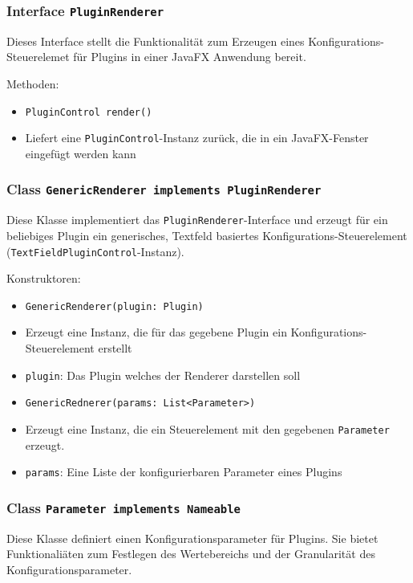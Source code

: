 \documentclass[parskip=full,11pt]{scrartcl}
\begin{document}
\subsubsection{Interface \texttt{PluginRenderer}}

Dieses Interface stellt die Funktionalität zum Erzeugen eines Konfigurations-Steuerelemet für Plugins in einer JavaFX Anwendung bereit.

Methoden:

\begin{itemize}\itemsep -10pt
	\item \texttt{PluginControl render()}
	\item[] Liefert eine \texttt{PluginControl}-Instanz zurück, die in ein JavaFX-Fenster eingefügt werden kann
\end{itemize}

\subsubsection{Class \texttt{GenericRenderer implements PluginRenderer}}

Diese Klasse implementiert das \texttt{PluginRenderer}-Interface und erzeugt für ein beliebiges Plugin ein generisches, Textfeld basiertes Konfigurations-Steuerelement (\texttt{TextFieldPluginControl}-Instanz).

Konstruktoren:

\begin{itemize}\itemsep -10pt
	\item \texttt{GenericRenderer(plugin: Plugin)}
	\item[] Erzeugt eine Instanz, die für das gegebene Plugin ein Konfigurations-Steuerelement erstellt
	\item[] \texttt{plugin}: Das Plugin welches der Renderer darstellen soll
	\item \texttt{GenericRednerer(params: List<Parameter>)}
	\item[] Erzeugt eine Instanz, die ein Steuerelement mit den gegebenen \texttt{Parameter} erzeugt.
	\item[] \texttt{params}: Eine Liste der konfigurierbaren Parameter eines Plugins
\end{itemize} 

\subsubsection{Class \texttt{Parameter implements Nameable}}

Diese Klasse definiert einen Konfigurationsparameter für Plugins. Sie bietet Funktionaliäten zum Festlegen des Wertebereichs und der Granularität des Konfigurationsparameter.
\end{document}
